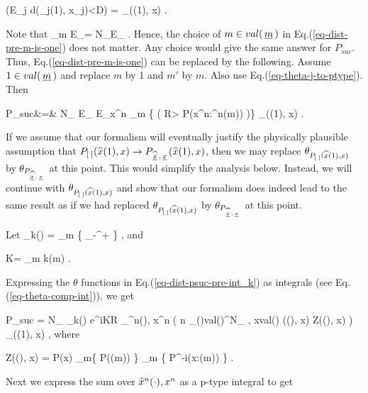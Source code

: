 \documentclass[12pt]{article}
\begin{document}
\beq
\theta(E_j d(_j(1), x_j)<D)
=
\theta_{\ptype{\;}((1), x)}
\;.
\label{eq-theta-j-to-ptype}
\eeq

Note that
\beq
\sum_m E_{\what{\calc}}=
N_\rvm E_{\what{\calc}}
\;.
\eeq
Hence, the choice of $m\in val({\,\underline{m}\,})$
in Eq.(\ref{eq-dist-pre-m-is-one})
does not matter. Any choice would
give the same answer for $P_{suc}$.
Thus,
Eq.(\ref{eq-dist-pre-m-is-one})
can be replaced by
the following.
Assume
$1\in val({\,\underline{m}\,})$
and replace
$m$ by 1 and $m'$ by $m$.
Also use
Eq.(\ref{eq-theta-j-to-ptype}).
Then


\beqa
P_{suc}&=&
N_\rvm
E_{\what{\calc}}
E_{x^n}
\prod_{m}
\left\{
\theta\left(
R> 
\ln
{}
{P(x^n:^n(m))}
\right)\right\}
\theta_{\ptype{\;}((1), x)}
\;.
\label{eq-dist-psuc-pre-int_k}
\eeqa



If we assume that
our formalism will eventually
justify the physically plausible assumption
that
${P_{[\;]} }({\widehat{x}}(1), x)\rightarrow
P_{{\widehat{{\,\underline{x}\,}}},{\,\underline{x}\,}}({\widehat{x}}(1), x)$,
then we may replace
$\theta_{{P_{[\;]} }({\widehat{x}}(1), x)}$
by $\theta_{P_{{\widehat{{\,\underline{x}\,}}}, {\,\underline{x}\,}}}$
at this point. This would
simplify the analysis below.
Instead, we will
continue with
$\theta_{{P_{[\;]} }({\widehat{x}}(1), x)}$
and show that
our formalism does indeed
lead to the same result
as if we had
replaced
$\theta_{{P_{[\;]} }({\widehat{x}}(1), x)}$
by $\theta_{P_{{\widehat{{\,\underline{x}\,}}}, {\,\underline{x}\,}}}$ at this point.



Let
\beq
\oint_{k(\cdot)} =
\prod_{m}
\left\{
\int_{-\infty}^{+\infty}
\;\;
\right\}
\;,
\eeq
and

\beq
K= \sum_{m} k(m)
\;.
\eeq

Expressing the $\theta$
functions in Eq.(\ref{eq-dist-psuc-pre-int_k})
 as
integrals (see Eq.(\ref{eq-theta-comp-int})),
we get


\beq
P_{suc} = N_\rvm
\oint_{k(\cdot)}
e^{iKR}
\sum_{^n(\cdot), x^n}
\exp\left(
n \sum_{(\cdot)\in val(\rvx)^{N_\rvm}
\;,\; x\in val(\rvx)}
\ptype{\;}((\cdot), x)
\ln Z((\cdot), x)
\right)
\theta_{\ptype{\;}((1), x)}
\;,
\eeq
where

\beq
Z((\cdot), x)
=
P(x)
\prod_m\left\{
P((m))
\right\}
\prod_{m}
\left\{
{P^{-i}(x:(m))}
\right\}
\;.
\eeq

Next we express the sum over ${\widehat{x}}^n(\cdot), x^n$
as a p-type integral to get
\end{document}
